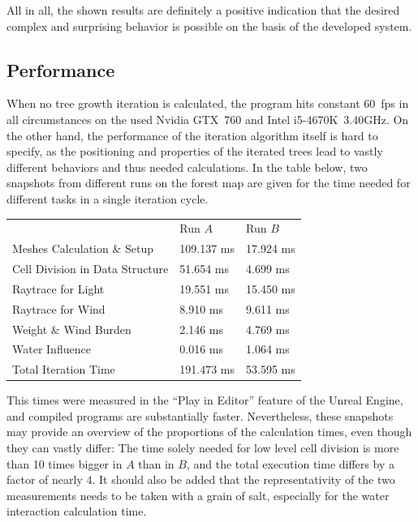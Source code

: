 \documentclass[11pt, abstract=on]{scrartcl}
\begin{document}
All in all, the shown results are definitely a positive indication that the desired complex and surprising behavior is possible on the basis of the developed system.

\subsection{Performance}
When no tree growth iteration is calculated, the program hits constant 60~fps in all circumstances on the used Nvidia GTX~760 and Intel i5-4670K~3.40GHz. On the other hand, the performance of the iteration algorithm itself is hard to specify, as the positioning and properties of the iterated trees lead to vastly different behaviors and thus needed calculations. In the table below, two snapshots from different runs on the forest map are given for the time needed for different tasks in a single iteration cycle.
\begin{center}
\begin{tabular}{ | l | l l |}
\hline
	& Run $A$ & Run $B$\\
\cline{2-3}
  Meshes Calculation \& Setup  & 109.137 ms & 17.924 ms\\
  Cell Division in Data Structure & 51.654 ms & 4.699 ms\\
  Raytrace for Light & 19.551 ms & 15.450 ms\\
  Raytrace for Wind & 8.910 ms & 9.611 ms \\
  Weight \& Wind Burden & 2.146 ms & 4.769 ms\\
  Water Influence & 0.016 ms & 1.064 ms\\
  Total Iteration Time & 191.473 ms & 53.595 ms\\
\hline
\end{tabular}
\end{center}

This times were measured in the ``Play in Editor'' feature of the Unreal Engine, and compiled programs are substantially faster. Nevertheless, these snapshots may provide an overview of the proportions of the calculation times, even though they can vastly differ: The time solely needed for low level cell division is more than 10 times bigger in $A$ than in $B$, and the total execution time differs by a factor of nearly 4. It should also be added that the representativity of the two measurements needs to be taken with a grain of salt, especially for the water interaction calculation time.
\end{document}
